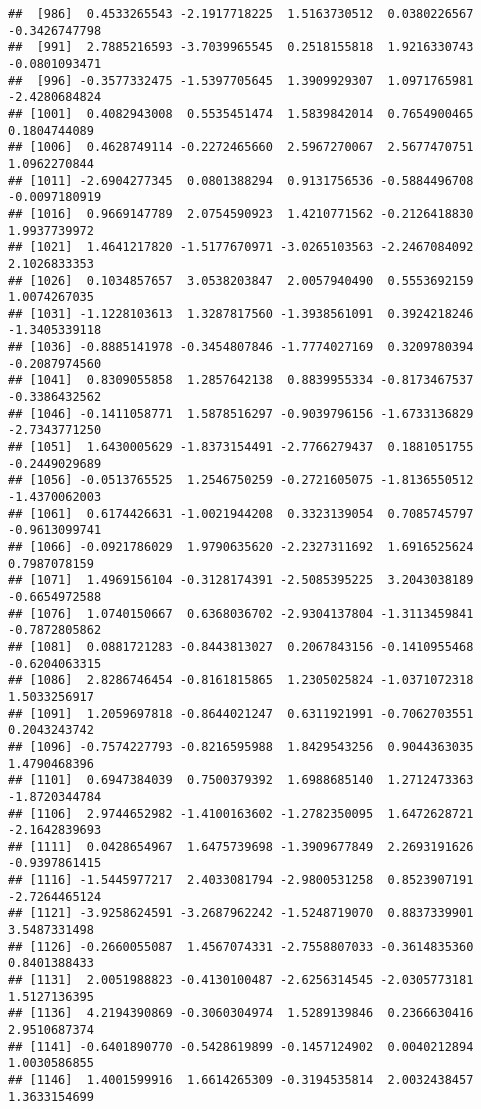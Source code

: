 \documentclass[
]{article}
\begin{document}
\begin{verbatim}
##  [986]  0.4533265543 -2.1917718225  1.5163730512  0.0380226567 -0.3426747798
##  [991]  2.7885216593 -3.7039965545  0.2518155818  1.9216330743 -0.0801093471
##  [996] -0.3577332475 -1.5397705645  1.3909929307  1.0971765981 -2.4280684824
## [1001]  0.4082943008  0.5535451474  1.5839842014  0.7654900465  0.1804744089
## [1006]  0.4628749114 -0.2272465660  2.5967270067  2.5677470751  1.0962270844
## [1011] -2.6904277345  0.0801388294  0.9131756536 -0.5884496708 -0.0097180919
## [1016]  0.9669147789  2.0754590923  1.4210771562 -0.2126418830  1.9937739972
## [1021]  1.4641217820 -1.5177670971 -3.0265103563 -2.2467084092  2.1026833353
## [1026]  0.1034857657  3.0538203847  2.0057940490  0.5553692159  1.0074267035
## [1031] -1.1228103613  1.3287817560 -1.3938561091  0.3924218246 -1.3405339118
## [1036] -0.8885141978 -0.3454807846 -1.7774027169  0.3209780394 -0.2087974560
## [1041]  0.8309055858  1.2857642138  0.8839955334 -0.8173467537 -0.3386432562
## [1046] -0.1411058771  1.5878516297 -0.9039796156 -1.6733136829 -2.7343771250
## [1051]  1.6430005629 -1.8373154491 -2.7766279437  0.1881051755 -0.2449029689
## [1056] -0.0513765525  1.2546750259 -0.2721605075 -1.8136550512 -1.4370062003
## [1061]  0.6174426631 -1.0021944208  0.3323139054  0.7085745797 -0.9613099741
## [1066] -0.0921786029  1.9790635620 -2.2327311692  1.6916525624  0.7987078159
## [1071]  1.4969156104 -0.3128174391 -2.5085395225  3.2043038189 -0.6654972588
## [1076]  1.0740150667  0.6368036702 -2.9304137804 -1.3113459841 -0.7872805862
## [1081]  0.0881721283 -0.8443813027  0.2067843156 -0.1410955468 -0.6204063315
## [1086]  2.8286746454 -0.8161815865  1.2305025824 -1.0371072318  1.5033256917
## [1091]  1.2059697818 -0.8644021247  0.6311921991 -0.7062703551  0.2043243742
## [1096] -0.7574227793 -0.8216595988  1.8429543256  0.9044363035  1.4790468396
## [1101]  0.6947384039  0.7500379392  1.6988685140  1.2712473363 -1.8720344784
## [1106]  2.9744652982 -1.4100163602 -1.2782350095  1.6472628721 -2.1642839693
## [1111]  0.0428654967  1.6475739698 -1.3909677849  2.2693191626 -0.9397861415
## [1116] -1.5445977217  2.4033081794 -2.9800531258  0.8523907191 -2.7264465124
## [1121] -3.9258624591 -3.2687962242 -1.5248719070  0.8837339901  3.5487331498
## [1126] -0.2660055087  1.4567074331 -2.7558807033 -0.3614835360  0.8401388433
## [1131]  2.0051988823 -0.4130100487 -2.6256314545 -2.0305773181  1.5127136395
## [1136]  4.2194390869 -0.3060304974  1.5289139846  0.2366630416  2.9510687374
## [1141] -0.6401890770 -0.5428619899 -0.1457124902  0.0040212894  1.0030586855
## [1146]  1.4001599916  1.6614265309 -0.3194535814  2.0032438457  1.3633154699

\end{verbatim}
\end{document}
